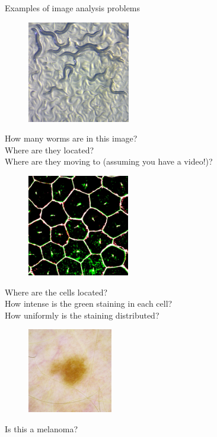 \documentclass[9pt, aspectratio=169]{beamer}
\begin{document}
\begin{frame}
    {Examples of image analysis problems}
    {
    \begin{figure}
        \includegraphics[height=12em]{c elegans - Zeiss - CC-BY 2.0.jpg}
        \caption{\color{gray}{Zeiss - CC-BY 2.0}}
    \end{figure}
    \centering
    How many worms are in this image?\\
    Where are they located?\\
    Where are they moving to (assuming you have a video!)?
    }
    {
    \begin{figure}
        \includegraphics[height=12em]{Retinal pigment epithelium - NIH - CC BY-NC 2.0.jpg}
        \caption{\color{gray}{NIH - CC-BY-SA 2.0}}
    \end{figure}
    \centering
    Where are the cells located?\\
    How intense is the green staining in each cell?\\
    How uniformly is the staining distributed?
    }
    {
    \begin{figure}
        \includegraphics[height=10em]{ISIC melanoma competition - CC0.png}
        \caption{\color{gray}{ISIC melanoma competition - CC-0}}
    \end{figure}
    \centering
    Is this a melanoma?
    }
\end{frame}
\end{document}
